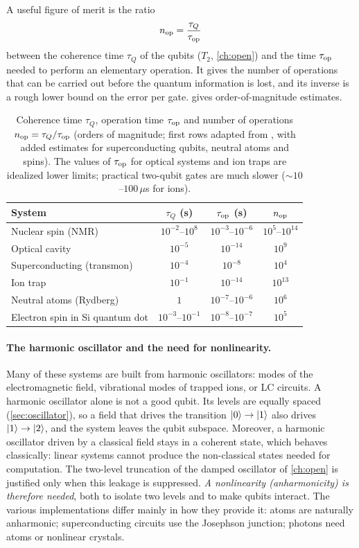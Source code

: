 A useful figure of merit is the ratio
\begin{equation}
  n_{\rm op}=\frac{\tau_Q}{\tau_{\rm op}}
\end{equation}
between the coherence time $\tau_Q$ of the qubits ($T_2$, \cref{ch:open}) and the time $\tau_{\rm op}$ needed to perform an elementary operation. It gives the number of operations that can be carried out before the quantum information
is lost, and its inverse is a rough lower bound on the error per gate.  gives order-of-magnitude estimates.
\begin{table}[h]\centering
\begin{tabular}{@{}lccc@{}}\toprule
System & $\tau_Q$ (s) & $\tau_{\rm op}$ (s) & $n_{\rm op}$\\ \midrule
Nuclear spin (NMR) & $10^{-2}$--$10^{8}$ & $10^{-3}$--$10^{-6}$ & $10^{5}$--$10^{14}$\\
Optical cavity & $10^{-5}$ & $10^{-14}$ & $10^{9}$\\
Superconducting (transmon) & $10^{-4}$ & $10^{-8}$ & $10^{4}$\\
Ion trap & $10^{-1}$ & $10^{-14}$ & $10^{13}$\\
Neutral atoms (Rydberg) & $1$ & $10^{-7}$--$10^{-6}$ & $10^{6}$\\
Electron spin in Si quantum dot & $10^{-3}$--$10^{-1}$ & $10^{-8}$--$10^{-7}$ & $10^{5}$\\ \bottomrule
\end{tabular}
\caption{Coherence time $\tau_Q$, operation time $\tau_{\rm op}$ and number of operations $n_{\rm op}=\tau_Q/\tau_{\rm op}$ (orders of magnitude; first rows adapted from \cite{NielsenChuang}, with added estimates for superconducting qubits,
neutral atoms and spins). The values of $\tau_{\rm op}$ for optical systems and ion traps are idealized lower limits; practical two-qubit gates are much slower ($\sim10$--$100\,\mu$s for ions).}\label{tab:platforms}
\end{table}

\paragraph{The harmonic oscillator and the need for nonlinearity.} Many of these systems are built from harmonic oscillators: modes of the electromagnetic field, vibrational modes of trapped ions, or LC circuits. A harmonic oscillator alone is
not a good qubit. Its levels are equally spaced (\cref{sec:oscillator}), so a field that drives the transition $\left|0\right\rangle\to\left|1\right\rangle$ also drives $\left|1\right\rangle\to\left|2\right\rangle$, and the system leaves the qubit subspace. Moreover, a harmonic oscillator driven by a
classical field stays in a coherent state, which behaves classically: linear systems cannot produce the non-classical states needed for computation. The two-level truncation of the damped oscillator of \cref{ch:open} is justified only when
this leakage is suppressed. \emph{A nonlinearity (anharmonicity) is therefore needed}, both to isolate two levels and to make qubits interact. The various implementations differ mainly in how they provide it: atoms are naturally anharmonic;
superconducting circuits use the Josephson junction; photons need atoms or nonlinear crystals.

